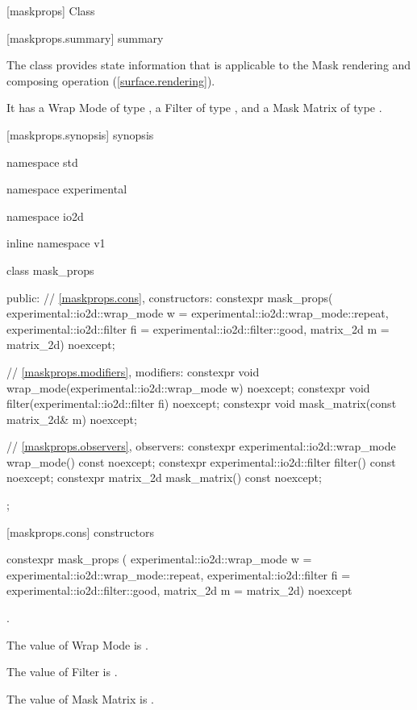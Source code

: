 
 [maskprops] {Class }

 [maskprops.summary] { summary}

\pnum
The  class provides state information that is applicable to the Mask rendering and composing operation (\ref{surface.rendering}).

\pnum
It has a Wrap Mode of type , a Filter of type , and a Mask Matrix of type .

 [maskprops.synopsis] { synopsis}

\begin{codeblock}
namespace std { namespace experimental { namespace io2d { inline namespace v1 {
  class mask_props {
  public:
    // \ref{maskprops.cons}, constructors:
    constexpr mask_props(
      experimental::io2d::wrap_mode w = experimental::io2d::wrap_mode::repeat,
      experimental::io2d::filter fi = experimental::io2d::filter::good,
      matrix_2d m = matrix_2d{}) noexcept;

    // \ref{maskprops.modifiers}, modifiers:
    constexpr void wrap_mode(experimental::io2d::wrap_mode w) noexcept;
    constexpr void filter(experimental::io2d::filter fi) noexcept;
    constexpr void mask_matrix(const matrix_2d& m) noexcept;

    // \ref{maskprops.observers}, observers:
    constexpr experimental::io2d::wrap_mode wrap_mode() const noexcept;
    constexpr experimental::io2d::filter filter() const noexcept;
    constexpr matrix_2d mask_matrix() const noexcept;
  };
}}}}
\end{codeblock}

 [maskprops.cons] { constructors}

\begin{itemdecl}
constexpr mask_props (
  experimental::io2d::wrap_mode w = experimental::io2d::wrap_mode::repeat,
  experimental::io2d::filter fi = experimental::io2d::filter::good,
  matrix_2d m = matrix_2d{}) noexcept    
\end{itemdecl}
\begin{itemdescr}
\onecolumn
\requires
{}.

\pnum
\effects
The value of Wrap Mode is .

\pnum
The value of Filter is .

\pnum
The value of Mask Matrix is .
\end{itemdescr}

